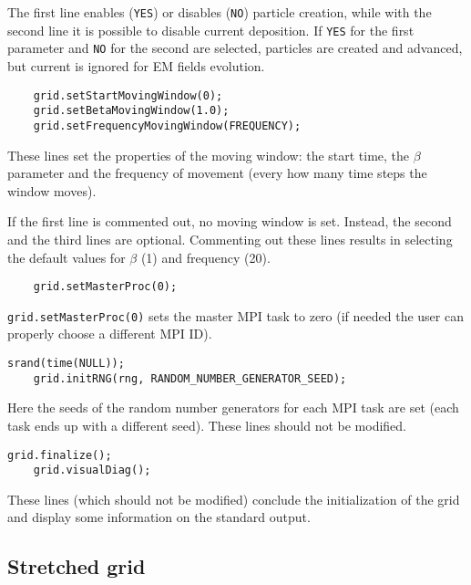 \documentclass[11pt,a4paper]{report}
\begin{document}
The first line enables (\verb+YES+) or disables (\verb+NO+) particle creation, while with the second line it is possible to disable current deposition. If \verb+YES+ for the first parameter and \verb+NO+ for the second are selected, particles are created and advanced, but current is ignored for EM fields evolution.
\begin{lstlisting}
	grid.setStartMovingWindow(0);
	grid.setBetaMovingWindow(1.0);
	grid.setFrequencyMovingWindow(FREQUENCY);
\end{lstlisting}
These lines set the properties of the moving window: the start time, the $\beta$ parameter and the frequency of movement (every how many time steps the window moves).

If the first line is commented out, no moving window is set. Instead, the second and the third lines are optional. Commenting out these lines results in selecting the default values for $\beta$ (1) and frequency (20).
\begin{lstlisting}
	grid.setMasterProc(0);
\end{lstlisting}
\verb+grid.setMasterProc(0)+ sets the master MPI task to zero (if needed the user can properly choose a different MPI ID). 
\begin{lstlisting}[backgroundcolor=\color{no_modify}]
	srand(time(NULL));
	grid.initRNG(rng, RANDOM_NUMBER_GENERATOR_SEED);
\end{lstlisting}
Here the seeds of the random number generators for each MPI task are set (each task ends up with a different seed). These lines should not be modified.
\begin{lstlisting}[backgroundcolor=\color{no_modify}]
	grid.finalize();
	grid.visualDiag();
\end{lstlisting}
These lines (which should not be modified) conclude the initialization of the grid and display some information on the standard output.


\subsection{Stretched grid}\label{subsection_stretch}
\end{document}
